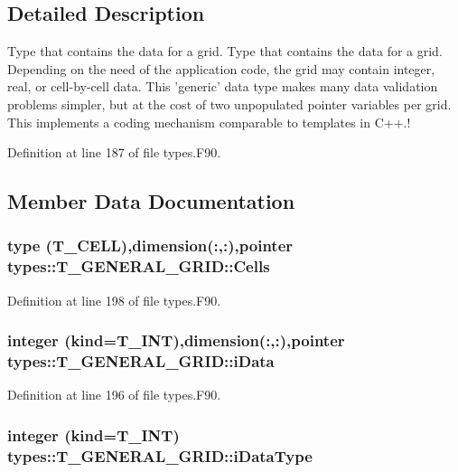 \subsection{Detailed Description}
Type that contains the data for a grid. Type that contains the data for a grid. Depending on the need of the application code, the grid may contain integer, real, or cell-\/by-\/cell data. This 'generic' data type makes many data validation problems simpler, but at the cost of two unpopulated pointer variables per grid. This implements a coding mechanism comparable to templates in C++.! 

Definition at line 187 of file types.F90.



\subsection{Member Data Documentation}
\hypertarget{typetypes_1_1_t___g_e_n_e_r_a_l___g_r_i_d_a1ae4dd93dfc3e0cb8c8d83393bbbbe7f}{
\subsubsection[{Cells}]{\setlength{\rightskip}{0pt plus 5cm}type ({\bf T\_\-CELL}),dimension(:,:),pointer {\bf types::T\_\-GENERAL\_\-GRID::Cells}}}
\label{typetypes_1_1_t___g_e_n_e_r_a_l___g_r_i_d_a1ae4dd93dfc3e0cb8c8d83393bbbbe7f}


Definition at line 198 of file types.F90.

\hypertarget{typetypes_1_1_t___g_e_n_e_r_a_l___g_r_i_d_aeb0bc4b49c62ee70efea7dc02a641a3c}{
\subsubsection[{iData}]{\setlength{\rightskip}{0pt plus 5cm}integer (kind={\bf T\_\-INT}),dimension(:,:),pointer {\bf types::T\_\-GENERAL\_\-GRID::iData}}}
\label{typetypes_1_1_t___g_e_n_e_r_a_l___g_r_i_d_aeb0bc4b49c62ee70efea7dc02a641a3c}


Definition at line 196 of file types.F90.

\hypertarget{typetypes_1_1_t___g_e_n_e_r_a_l___g_r_i_d_acff6c7004f31277df73101b20d58c238}{
\subsubsection[{iDataType}]{\setlength{\rightskip}{0pt plus 5cm}integer (kind={\bf T\_\-INT}) {\bf types::T\_\-GENERAL\_\-GRID::iDataType}}}
\label{typetypes_1_1_t___g_e_n_e_r_a_l___g_r_i_d_acff6c7004f31277df73101b20d58c238}



